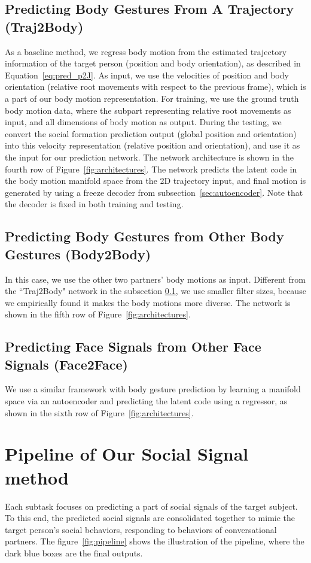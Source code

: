 \subsection{Predicting Body Gestures From A Trajectory (Traj2Body)}
\label{sec:traj2body}
As a baseline method, we regress body motion from the estimated trajectory information of the target person (position and body orientation), as described in Equation~\ref{eq:pred_p2J}. As input, we use the velocities of position and body orientation (relative root movements with respect to the previous frame), which is a part of our body motion representation. For training, we use the ground truth body motion data, where the subpart representing relative root movements as input, and all dimensions of body motion as output. During the testing, we convert the social formation prediction output (global position and orientation) into this velocity representation (relative position and orientation), and use it as the input for our prediction network. The network architecture is shown in the fourth row of Figure~\ref{fig:architectures}. The network predicts the latent code in the body motion manifold space from the 2D trajectory input, and final motion is generated by using a freeze decoder from subsection~\ref{sec:autoencoder}. Note that the decoder is fixed in both training and testing. 

\subsection{Predicting Body Gestures from Other Body Gestures (Body2Body)}

In this case, we use the other two partners' body motions as input. Different from the ``Traj2Body" network in the subsection \ref{sec:traj2body}, we use smaller filter sizes, because we empirically found it makes the body motions more diverse. The network is shown in the fifth row of Figure~\ref{fig:architectures}.

\subsection{Predicting Face Signals from Other Face Signals (Face2Face)}

We use a similar framework with body gesture prediction by learning a manifold space via an autoencoder and predicting the latent code using a regressor, as shown in the sixth row of Figure~\ref{fig:architectures}.

\section{Pipeline of Our Social Signal method}
Each subtask focuses on predicting a part of social signals of the target subject.  To this end,  the predicted social signals are consolidated together to mimic the target person's social behaviors, responding to behaviors of conversational partners. The figure~\ref{fig:pipeline} shows the illustration of the pipeline, where the dark blue boxes are the final outputs. 
